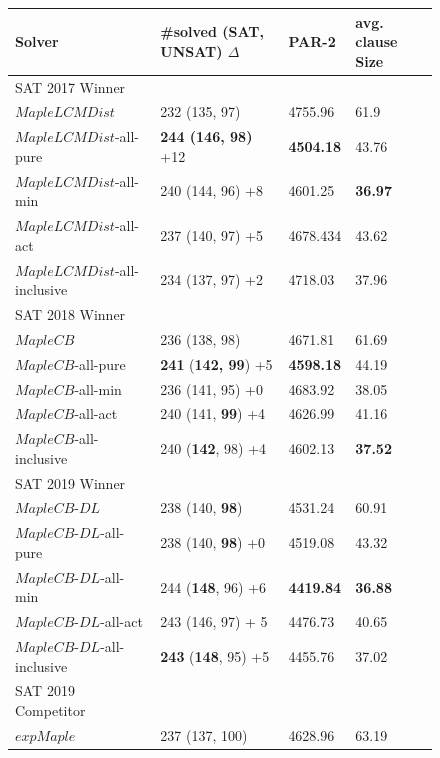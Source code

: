 \documentclass[runningheads]{llncs}
\newcommand{\fss}[2]{\fontsize{#1}{#2}\selectfont}
\newcommand{\MapleSeven}{\textit{MapleLCMDist}}
\newcommand{\MapleNineShort}{\textit{MapleCB-DL} }
\newcommand{\expSATShort}{\textit{expMaple} }
\newcommand{\MapleEightShort}{\textit{MapleCB}}
\begin{document}
\begin{figure} 
\begin{center}
\fss{8pt}{10pt}
\begin{tabular}{|l|l|l|l|} 
\hline
Solver & \#solved (SAT, UNSAT) $\Delta$ & PAR-2 & avg. clause Size \\ 
\hline
SAT 2017 Winner & & & \\
$\MapleSeven$ & 232 (135, 97) & 4755.96 & 61.9  \\ 
\hline
$\MapleSeven$-all-pure & \textbf{244 (146, 98)} +12 & \textbf{4504.18} & 43.76 \\
\hline
$\MapleSeven$-all-min & 240 (144, 96) +8 & 4601.25 & \textbf{36.97} \\ 
\hline
$\MapleSeven$-all-act & 237 (140, 97) +5 & 4678.434 & 43.62 \\ 
\hline
$\MapleSeven$-all-inclusive & 234 (137, 97) +2 & 4718.03 & 37.96 \\
\hline
\hline
SAT 2018 Winner & & & \\
$\MapleEightShort$ & 236 (138, 98) & 4671.81 & 61.69 \\
\hline
$\MapleEightShort$-all-pure & \textbf{241} (\textbf{142, 99}) +5 & \textbf{4598.18} & 44.19 \\
\hline
$\MapleEightShort$-all-min & 236 (141, 95) +0 & 4683.92 & 38.05 \\ 
\hline
$\MapleEightShort$-all-act & 240 (141, \textbf{99}) +4 & 4626.99 & 41.16 \\
\hline
$\MapleEightShort$-all-inclusive & 240 (\textbf{142}, 98) +4 & 4602.13 & \textbf{37.52} \\
\hline
\hline
SAT 2019 Winner & & & \\
$\MapleNineShort$ & 238 (140, \textbf{98}) & 4531.24 & 60.91 \\
\hline
$\MapleNineShort$-all-pure & 238 (140, \textbf{98}) +0 & 4519.08 &  43.32\\
\hline
$\MapleNineShort$-all-min & 244 (\textbf{148}, 96) +6 & \textbf{4419.84} & \textbf{36.88} \\
\hline
$\MapleNineShort$-all-act & 243 (146, 97) + 5 & 4476.73 & 40.65 \\
\hline
$\MapleNineShort$-all-inclusive & \textbf{243} (\textbf{148}, 95) +5 & 4455.76 & 37.02 \\
\hline
\hline
SAT 2019 Competitor & & &\\
$\expSATShort$ & 237 (137, 100)  & 4628.96 & 63.19 \\

\end{tabular}
\end{center}
\end{figure}
\end{document}
